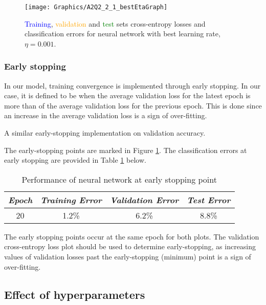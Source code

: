 \documentclass[a4paper,12pt]{article}
\begin{document}
\begin{figure}[!htb]
\centering
\texttt{[image: Graphics/A2Q2\_2\_1\_bestEtaGraph]}
\caption{\label{figure:NN_LearningRate} \textcolor{blue}{Training}, \textcolor{orange}{validation} and \textcolor{green}{test} sets cross-entropy losses and classification errors for neural network with best learning rate, $\eta = 0.001$.}
\end{figure}

\clearpage
\subsubsection{Early stopping}
In our model, training convergence is implemented through early stopping. In our case, it is defined to be when the average validation loss for the latest epoch is more than of the average validation loss for the previous epoch. This is done since an increase in the average validation loss is a sign of over-fitting.

A similar early-stopping implementation on validation accuracy. 

The early-stopping points are marked in Figure \ref{figure:NN_LearningRate}. The classification errors at early stopping are provided in Table \ref{table:NN_EarlyStopping} below.

\begin{table}[!htb]
\centering
\caption{Performance of neural network at early stopping point}
\label{table:NN_EarlyStopping}
\vspace{0.5em}
\begin{tabular}{|c|c c c|} \hline
\textit{Epoch} & \textit{Training Error} & \textit{Validation Error} & \textit{Test Error} \\ \hline
20 & 1.2\% & 6.2\% & 8.8\% \\
\hline
\end{tabular}
\end{table}

The early stopping points occur at the same epoch for both plots. The validation cross-entropy loss plot should be used to determine early-stopping, as increasing values of validation losses past the early-stopping (minimum) point is a sign of over-fitting. 

\clearpage
\subsection{Effect of hyperparameters}
\end{document}
